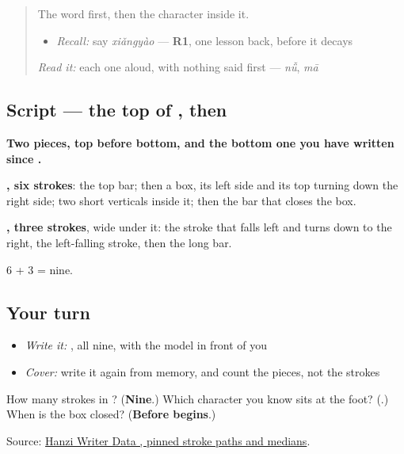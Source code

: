 \label{lesson:ZH-W91-yao}



\begin{quote}
The word first, then the character inside it.

\begin{itemize}
\raggedright
  \item \emph{Recall:} say \emph{xiǎngyào} — \textbf{R1}, one lesson back, before it decays
\end{itemize}

\begin{quote}
 
\end{quote}

\emph{Read it:} each one aloud, with nothing said first — \emph{nǚ}, \emph{mā}
\end{quote}

\subsection*{Script — the top of , then }

\begin{quote}
\end{quote}

\textbf{Two pieces, top before bottom, and the bottom one you have written since .}

\textbf{, six strokes}: the top bar; then a box, its left side and its top turning down the right side; two short verticals inside it; then the bar that closes the box.

\textbf{, three strokes}, wide under it: the stroke that falls left and turns down to the right, the left-falling stroke, then the long bar.

6 + 3 = nine.

\subsection*{Your turn}
\begin{itemize}
\raggedright
  \item \emph{Write it:} , all nine, with the model in front of you
  \item \emph{Cover:} write it again from memory, and count the pieces, not the strokes
\end{itemize}

\begin{tcolorbox}[breakable,colback=teal!4,colframe=teal!35!black,title={Before you move on}]
How many strokes in ? (\textbf{Nine}.) Which character you know sits at the foot? (\textbf{}.) When is the box closed? (\textbf{Before  begins}.)

Source: \href{https://raw.githubusercontent.com/chanind/hanzi-writer-data/68d10a4b21150cae5e1ebbd223eed289cf32d90c/data/\%E8\%A6\%81.json}{Hanzi Writer Data , pinned stroke paths and medians}.
\end{tcolorbox}

